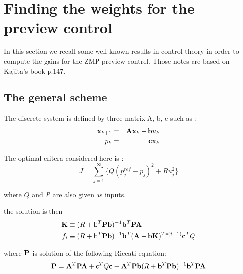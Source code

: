 \section{Finding the weights for the preview control }

In this section we recall some well-known results in control theory in order to compute
the gains for the ZMP preview control. Those notes are based on Kajita's book \cite{Kajita2005} p.147.

\subsection{The general scheme \cite{Katayama1985}}
The discrete system is	defined by three matrix A, b, c
     such as :
     \begin{equation}
	\begin{aligned}
     {\bf x}_{k+1} & =& {\bf A} {\bf x}_k + {\bf b} u_k \\
     p_k &=& {\bf cx}_k\\
	\end{aligned}
     \end{equation}

     The optimal critera considered here is :
     \begin{equation}
     J = \sum^{\infty}_{j=1} \{ Q(p^{ref}_j -p_j)^2 + Ru_j^2 \}
     \end{equation}

     where $ Q $ and $ R $ are also given as inputs.

    the solution is then
     \begin{equation}
	\begin{aligned}
     {\bf K} & \equiv  (R + {\bf b}^T{\bf Pb})^{-1}{\bf b}^T{\bf PA} \\
     f_i & \equiv  (R + {\bf b}^T{\bf Pb})^{-1}{\bf b}^T({\bf A}-{\bf bK})^{T*(i-1)}{\bf c}^TQ \\
	\end{aligned}
     \end{equation}


 where $ {\bf P} $ is solution of the following Riccati equation:
\begin{equation}
 {\bf P} = {\bf A}^T {\bf PA} + {\bf c}^TQ{\bf c} - {\bf A}^T{\bf Pb}(R + {\bf b}^T{\bf Pb})^{-1}{\bf b}^T{\bf PA}
\end{equation}


